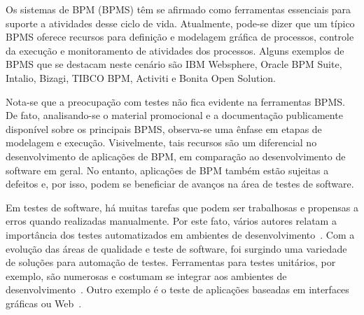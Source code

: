 \documentclass[12pt]{article}
\begin{document}
Os sistemas de BPM (BPMS) têm se afirmado como ferramentas essenciais para suporte a atividades desse ciclo de vida. Atualmente, pode-se dizer que um típico BPMS oferece recursos para definição e modelagem gráfica de processos, controle da execução e monitoramento de atividades dos processos. Alguns exemplos de BPMS que se destacam neste cenário são IBM Websphere, Oracle BPM Suite, Intalio, Bizagi, TIBCO BPM, Activiti e Bonita Open Solution.

Nota-se que a preocupação com testes não fica evidente na ferramentas BPMS. De fato, analisando-se o material promocional e a documentação publicamente disponível sobre os principais BPMS, observa-se uma ênfase em etapas de modelagem e execução. Visivelmente, tais recursos são um diferencial no desenvolvimento de aplicações de BPM, em comparação ao desenvolvimento de software em geral. No entanto, aplicações de BPM também estão sujeitas a defeitos e, por isso, podem se beneficiar de avanços na área de testes de software.


Em testes de software, há muitas tarefas que podem ser trabalhosas e propensas a erros quando realizadas manualmente. Por este fato, vários autores relatam a importância dos testes automatizados em ambientes de desenvolvimento~\cite{sbqs2013}. Com a evolução das áreas de qualidade e teste de software, foi surgindo uma variedade de soluções para automação de testes. Ferramentas para testes unitários, por exemplo, são numerosas e costumam se integrar aos ambientes de desenvolvimento~\cite{unittesting}. Outro exemplo é o teste de aplicações baseadas em interfaces gráficas ou Web~\cite{webtesting}.
\end{document}
